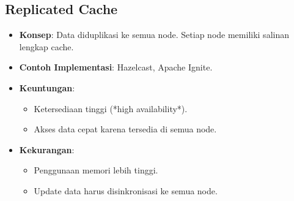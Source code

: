 \documentclass[11pt, a4paper]{book}
\begin{document}
	\subsection{Replicated Cache}
	\label{subsec:replicated}
	
	\begin{itemize}
		\item \textbf{Konsep}:  
		Data diduplikasi ke semua node. Setiap node memiliki salinan lengkap cache.
		
		\item \textbf{Contoh Implementasi}:  
		Hazelcast, Apache Ignite.
		
		\item \textbf{Keuntungan}:
		\begin{itemize}
			\item Ketersediaan tinggi (*high availability*).
			\item Akses data cepat karena tersedia di semua node.
		\end{itemize}
		
		\item \textbf{Kekurangan}:
		\begin{itemize}
			\item Penggunaan memori lebih tinggi.
			\item Update data harus disinkronisasi ke semua node.
		\end{itemize}
	\end{itemize}
	
\end{document}
